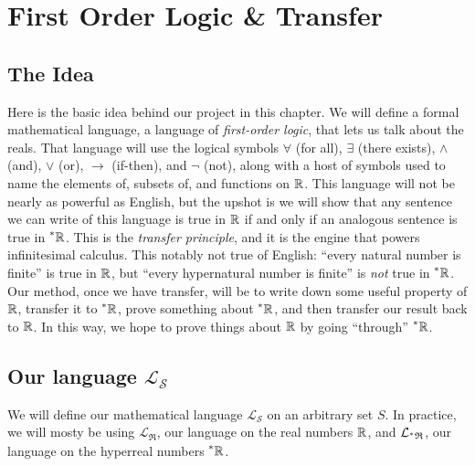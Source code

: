 \section{First Order Logic \& Transfer}\label{sec:FOLTransfer}
\subsection{The Idea}
Here is the basic idea behind our project in this chapter. We will define a formal mathematical language, a language of \textit{first-order logic}, that lets us talk about the reals. That language will use the logical symbols $\forall$ (for all), $\exists$ (there exists), $\land$ (and), $\lor$ (or), $\to$ (if-then), and $\neg$ (not), along with a host of symbols used to name the elements of, subsets of, and functions on $\mathbb{R}$. This language will not be nearly as powerful as English, but the upshot is we will show that any sentence we can write of this language is true in $\mathbb{R}$ if and only if an analogous sentence is true in $\prescript{*}{}{\mathbb{R}}$. This is the \textit{transfer principle}, and it is the engine that powers infinitesimal calculus. This notably not true of English: ``every natural number is finite'' is true in $\mathbb{R}$, but ``every hypernatural number is finite'' is \textit{not} true in $\prescript{*}{}{\mathbb{R}}$. Our method, once we have transfer, will be to write down some useful property of $\mathbb{R}$, transfer it to $\prescript{*}{}{\mathbb{R}}$, prove something about $\prescript{*}{}{\mathbb{R}}$, and then transfer our result back to $\mathbb{R}$. In this way, we hope to prove things about $\mathbb{R}$ by going ``through'' $\prescript{*}{}{\mathbb{R}}$.

\subsection{Our language \texorpdfstring{$\mathcal{L}_\mathscr{S}$}{L S}}
We will define our mathematical language $\mathcal{L}_\mathscr{S}$ on an arbitrary set $S$. In practice, we will mosty be using $\mathcal{L}_\mathfrak{R}$, our language on the real numbers $\mathbb{R}$, and $\mathcal{L}_{\prescript{*}{}{\mathfrak{R}}}$, our language on the hyperreal numbers $\prescript{*}{}{\mathbb{R}}$.

